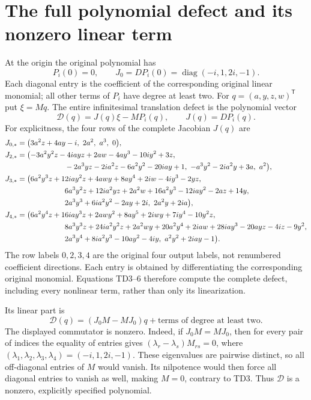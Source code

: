 \documentclass[11pt]{article}
\newcommand{\diag}{\operatorname{diag}}
\begin{document}
\section{The full polynomial defect and its nonzero linear term}
At the origin the original polynomial has
\begin{equation}
 P_i(0)=0,\qquad J_0=DP_i(0)=\diag(-i,1,2i,-1).\tag{TD5}
\end{equation}
Each diagonal entry is the coefficient of the corresponding original
linear monomial; all other terms of $P_i$ have degree at least two.
For $q=(a,y,z,w)^{\mathsf T}$ put $\xi=Mq$. The entire
infinitesimal translation defect is the polynomial vector
\begin{equation}
 \mathcal D(q)=J(q)\xi-MP_i(q),\qquad J(q)=DP_i(q).\tag{TD6}
\end{equation}
For explicitness, the four rows of the complete Jacobian $J(q)$ are
\begin{align*}
J_{0,*}={}&\bigl(3a^2z+4ay-i,\ 2a^2,\ a^3,\ 0\bigr),\\
J_{2,*}={}&\bigl(
 -3a^2y^2z-4iayz+2aw-4ay^3-10iy^2+3z,\\
 &\hspace{18mm}-2a^3yz-2ia^2z-6a^2y^2-20iay+1,\
 -a^3y^2-2ia^2y+3a,\ a^2\bigr),\\
J_{3,*}={}&\bigl(
 6a^2y^3z+12iay^2z+4awy+8ay^4+2iw-4iy^3-2yz,\\
 &\hspace{18mm}6a^3y^2z+12ia^2yz+2a^2w+16a^2y^3
                  -12iay^2-2az+14y,\\
 &\hspace{18mm}2a^3y^3+6ia^2y^2-2ay+2i,\ 2a^2y+2ia\bigr),\\
J_{4,*}={}&\bigl(
 6a^2y^4z+16iay^3z+2awy^2+8ay^5+2iwy+7iy^4-10y^2z,\\
 &\hspace{18mm}8a^3y^3z+24ia^2y^2z+2a^2wy+20a^2y^4
        +2iaw+28iay^3-20ayz-4iz-9y^2,\\
 &\hspace{18mm}2a^3y^4+8ia^2y^3-10ay^2-4iy,\
 a^2y^2+2iay-1\bigr).
\end{align*}
The row labels $0,2,3,4$ are the original four output labels, not
renumbered coefficient directions. Each entry is obtained by
differentiating the corresponding original monomial. Equations
TD3--6 therefore compute the complete defect, including every
nonlinear term, rather than only its linearization.

Its linear part is
\begin{equation}
 \mathcal D(q)=(J_0M-MJ_0)q+\text{terms of degree at least two}.
 \tag{TD7}
\end{equation}
The displayed commutator is nonzero. Indeed, if $J_0M=MJ_0$,
then for every pair of indices the equality of entries gives
$(\lambda_r-\lambda_s)M_{rs}=0$, where
$(\lambda_1,\lambda_2,\lambda_3,\lambda_4)=(-i,1,2i,-1)$.
These eigenvalues are pairwise distinct, so all off-diagonal entries
of $M$ would vanish. Its nilpotence would then force all diagonal
entries to vanish as well, making $M=0$, contrary to TD3. Thus
$\mathcal D$ is a nonzero, explicitly specified polynomial.
\end{document}
